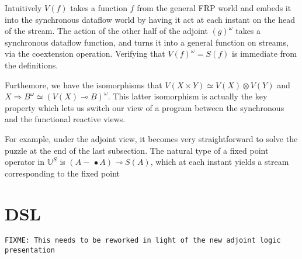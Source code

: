 \documentclass[preprint]{sigplanconf}
\newcommand{\ultrametric}{\mathbb{U}}
\newcommand{\To}{\Rightarrow}
\newcommand{\shrink}{\rightsquigarrow}
\newcommand{\lolli}{\multimap}
\newcommand{\lollishrink}{-\!\!\!\,\bullet}
\newcommand{\judge}[3][\Gamma]{{#1} \vdash {#2} : {#3}}
\newcommand{\judgec}[4][\Gamma]{{#1};{#2} \vdash {#3} : {#4}}
\newcommand{\const}[1]{\left<{#1}\right>}
\newcommand{\pair}[2]{({#1}, {#2})}
\newcommand{\fst}[1]{\pi_1{#1}}
\newcommand{\snd}[1]{\pi_2{#1}}
\newcommand{\unit}{()}
\newcommand{\letc}[3]{\mathsf{letc}\;{#1} = {#2}\;\mathsf{in}\;{#3}}
\newcommand{\fun}[2]{\lambda {#1}.\;{#2}}
\newcommand{\sfun}[2]{\hat{\lambda} {#1}.\;{#2}}
\newcommand{\fixme}[1]{\texttt{FIXME: {#1}}}
\begin{document}
Intuitively $V(f)$ takes a function $f$ from the general FRP world and
embeds it into the synchronous dataflow world by having it act at each
instant on the head of the stream. The action of the other half of the
adjoint $(g)^\omega$ takes a synchronous dataflow function, and turns
it into a general function on streams, via the coextension operation. 
Verifying that $V(f)^\omega = S(f)$ is immediate from the definitions. 

Furthemore, we have the isomorphisms that $V(X \times Y) \simeq V(X)
\otimes V(Y)$ and $X \To B^\omega \simeq (V(X) \lolli B)^\omega$. This
latter isomorphism is actually the key property which lets us switch
our view of a program between the synchronous and the functional
reactive views.

For example, under the adjoint view, it becomes very straightforward 
to solve the puzzle at the end of the last subsection. The natural type of
a fixed point operator in $\ultrametric^S$ is $(A \lollishrink A) \lolli S(A)$,
which at each instant yields a stream corresponding to the fixed point 

\section{DSL}

\fixme{This needs to be reworked in light of the new adjoint logic presentation}

\end{document}
